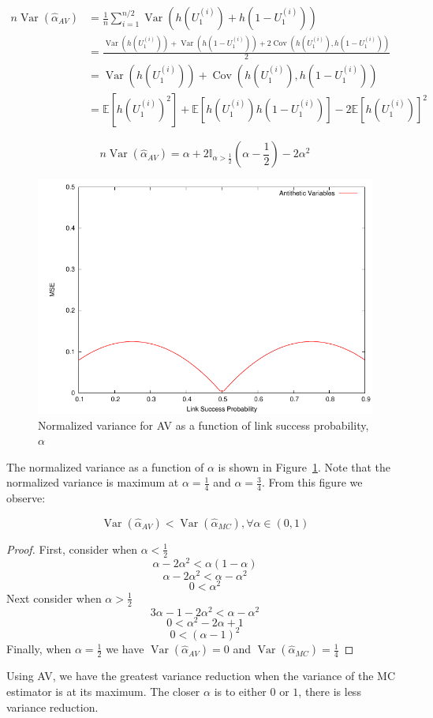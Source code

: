 \documentclass[10pt]{article}
\DeclareMathOperator{\var}{Var}
\DeclareMathOperator{\cov}{Cov}
\begin{document}
\begin{align*}
n\var\left(\hat{\alpha}_{AV}\right) &= \frac{1}{n}\sum_{i=1}^{n/2}\var\left(h(U_{1}^{(i)}) + h(1-U_{1}^{(i)})\right)\\
&=\frac{\var\left(h(U_{1}^{(i)})\right) + \var\left(h(1-U_{1}^{(i)})\right) + 2\cov\left(h(U_{1}^{(i)}),h(1-U_{1}^{(i)})\right)}{2}\\
&=\var\left(h(U_{1}^{(i)})\right) + \cov\left(h(U_{1}^{(i)}),h(1-U_{1}^{(i)})\right)\\
&=\mathbb{E}\left[h(U_{1}^{(i)})^2\right] + \mathbb{E}\left[h(U_{1}^{(i)})h(1-U_{1}^{(i)})\right] - 2\mathbb{E}\left[h(U_{1}^{(i)})\right]^{2}
\end{align*}

\begin{equation}
n\var\left(\hat{\alpha}_{AV}\right)=\alpha+ 2\mathbb{I}_{\alpha > \frac{1}{2}}(\alpha-\frac{1}{2})-2\alpha^{2}\label{eq:av_var}
\end{equation}

\begin{figure}[ht!]
\centering
\includegraphics[width=0.5\columnwidth]{img/av}
\caption[Normalized variance for \acs{AV} as a function of link success probability, $\alpha$]{Normalized variance for \acf{AV} as a function of link success probability, $\alpha$}\label{fig:av}
\end{figure}

The normalized variance as a function of $\alpha$ is shown in Figure~\ref{fig:av}. Note that the normalized variance is maximum at $\alpha = \frac{1}{4}$ and $\alpha = \frac{3}{4}$. From this figure we observe:
\begin{proposition}\label{prop:av}
\[
\var\left(\hat{\alpha}_{AV}\right) < \var\left(\hat{\alpha}_{MC}\right), \forall \alpha \in (0,1)
\]
\end{proposition}

\begin{proof}
First, consider when $\alpha < \frac{1}{2}$
\[
\alpha - 2\alpha^2  <  \alpha(1-\alpha)
\]
\[
\alpha - 2\alpha^2  <  \alpha-\alpha^2
\]
\[
0  <  \alpha^2
\]
Next consider when $\alpha > \frac{1}{2}$
\[
3\alpha - 1 - 2\alpha^2 < \alpha - \alpha^{2}
\]
\[
0 < \alpha^2 - 2\alpha + 1
\]
\[
0 < (\alpha - 1)^2
\]
Finally, when $\alpha = \frac{1}{2}$ we have $\var\left(\hat{\alpha}_{AV}\right) = 0$ and $\var\left(\hat{\alpha}_{MC}\right) = \frac{1}{4}$
\end{proof}
Using \ac{AV}, we have the greatest variance reduction when the variance of the \ac{MC} estimator is at its maximum. The closer $\alpha$ is to either $0$ or $1$, there is less variance reduction.
\end{document}
